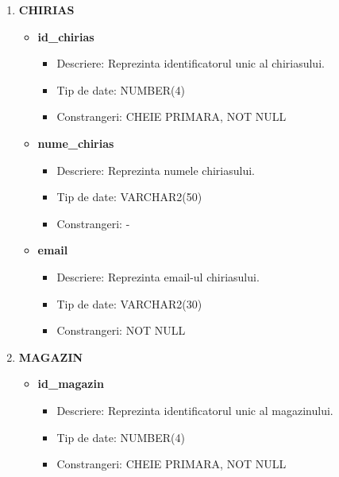 \begin{enumerate}
    \vspace{0.5cm}

    \item \textbf{CHIRIAS}
    \begin{itemize}
    
        \item \textbf{id\_chirias}
                \begin{itemize}
                    \item Descriere: Reprezinta identificatorul unic al chiriasului.
                    \item Tip de date: NUMBER(4)
                    \item Constrangeri: CHEIE PRIMARA, NOT NULL
                \end{itemize}
                
        \item \textbf{nume\_chirias}
                \begin{itemize}
                    \item Descriere: Reprezinta numele chiriasului.
                    \item Tip de date: VARCHAR2(50)
                    \item Constrangeri: -
                \end{itemize}

        \item \textbf{email}
                \begin{itemize}
                    \item Descriere: Reprezinta email-ul chiriasului.
                    \item Tip de date: VARCHAR2(30)
                    \item Constrangeri: NOT NULL
                \end{itemize}

    \end{itemize}

    \vspace{0.5cm}

    \item \textbf{MAGAZIN}
    \begin{itemize}
    
        \item \textbf{id\_magazin}
                \begin{itemize}
                    \item Descriere: Reprezinta identificatorul unic al magazinului.
                    \item Tip de date: NUMBER(4)
                    \item Constrangeri: CHEIE PRIMARA, NOT NULL
                \end{itemize}
                

\end{itemize}
\end{enumerate}
